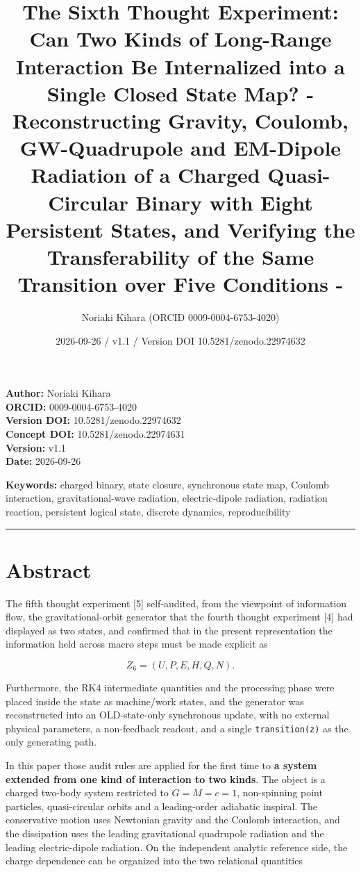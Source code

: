 \documentclass[
  a4paper,
]{article}
\title{The Sixth Thought Experiment: Can Two Kinds of Long-Range
Interaction Be Internalized into a Single Closed State Map? -
Reconstructing Gravity, Coulomb, GW-Quadrupole and EM-Dipole Radiation
of a Charged Quasi-Circular Binary with Eight Persistent States, and
Verifying the Transferability of the Same Transition over Five
Conditions -}
\author{Noriaki Kihara (ORCID 0009-0004-6753-4020)}
\date{2026-09-26 / v1.1 / Version DOI 10.5281/zenodo.22974632}
\begin{document}
\maketitle

\textbf{Author:} Noriaki Kihara\\
\textbf{ORCID:} 0009-0004-6753-4020\\
\textbf{Version DOI:} 10.5281/zenodo.22974632\\
\textbf{Concept DOI:} 10.5281/zenodo.22974631\\
\textbf{Version:} v1.1\\
\textbf{Date:} 2026-09-26

\textbf{Keywords:} charged binary, state closure, synchronous state map,
Coulomb interaction, gravitational-wave radiation, electric-dipole
radiation, radiation reaction, persistent logical state, discrete
dynamics, reproducibility

\begin{center}\rule{0.5\linewidth}{0.5pt}\end{center}

\section{Abstract}\label{abstract}

The fifth thought experiment {[}5{]} self-audited, from the viewpoint of
information flow, the gravitational-orbit generator that the fourth
thought experiment {[}4{]} had displayed as two states, and confirmed
that in the present representation the information held across macro
steps must be made explicit as

\[
Z_6=(U,P,E,H,Q,N).
\]

Furthermore, the RK4 intermediate quantities and the processing phase
were placed inside the state as machine/work states, and the generator
was reconstructed into an OLD-state-only synchronous update, with no
external physical parameters, a non-feedback readout, and a single
\texttt{transition(z)} as the only generating path.

In this paper those audit rules are applied for the first time to
\textbf{a system extended from one kind of interaction to two kinds}.
The object is a charged two-body system restricted to \(G=M=c=1\),
non-spinning point particles, quasi-circular orbits and a leading-order
adiabatic inspiral. The conservative motion uses Newtonian gravity and
the Coulomb interaction, and the dissipation uses the leading
gravitational quadrupole radiation and the leading electric-dipole
radiation. On the independent analytic reference side, the charge
dependence can be organized into the two relational quantities
\end{document}
